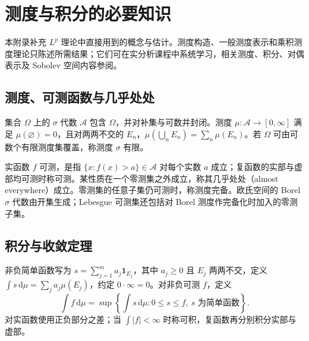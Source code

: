 \setcounter{chapter}{0} %
\chapter{测度与积分的必要知识}
\label{app:fa-measure}

本附录补充 $L^p$ 理论中直接用到的概念与估计。测度构造、一般测度表示和乘积测度理论只陈述所需结果；它们可在实分析课程中系统学习，相关测度、积分、对偶表示及 Sobolev 空间内容参阅\cite{teschl-ra}。

\section{测度、可测函数与几乎处处}
集合 $\Omega$ 上的 $\sigma$ 代数 $\mathcal A$ 包含 $\Omega$，并对补集与可数并封闭。测度 $\mu:\mathcal A\to[0,\infty]$ 满足 $\mu(\varnothing)=0$，且对两两不交的 $E_n$，$\mu(\bigcup_nE_n)=\sum_n\mu(E_n)$。若 $\Omega$ 可由可数个有限测度集覆盖，称测度 $\sigma$ 有限。

实函数 $f$ 可测，是指 $\{x:f(x)>a\}\in\mathcal A$ 对每个实数 $a$ 成立；复函数的实部与虚部均可测时称可测。某性质在一个零测集之外成立，称其几乎处处（almost everywhere）成立。零测集的任意子集仍可测时，称测度完备。欧氏空间的 Borel $\sigma$ 代数由开集生成；Lebesgue 可测集还包括对 Borel 测度作完备化时加入的零测子集。

\section{积分与收敛定理}
非负简单函数写为 $s=\sum_{j=1}^ma_j\mathbf1_{E_j}$，其中 $a_j\geq0$ 且 $E_j$ 两两不交，定义 $\int s\,\mathrm d\mu=\sum_ja_j\mu(E_j)$，约定 $0\cdot\infty=0$。对非负可测 $f$，定义
\[
 \int f\,\mathrm d\mu=\sup\left\{\int s\,\mathrm d\mu:0\leq s\leq f,\ s\text{ 为简单函数}\right\}.
\]
对实函数使用正负部分之差；当 $\int|f|<\infty$ 时称可积，复函数再分别积分实部与虚部。

